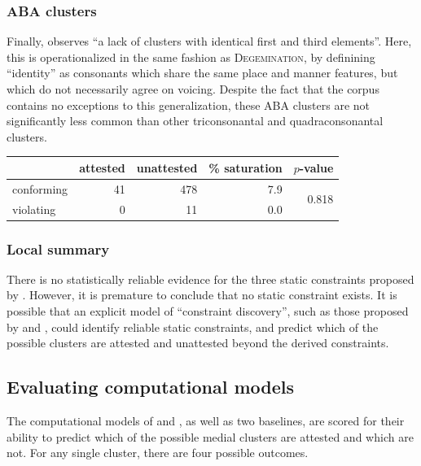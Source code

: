 \subsubsection{ABA clusters}

Finally, \citet[][176]{Pierrehumbert1994} observes ``a lack of clusters with identical first and third elements''. Here, this is operationalized in the same fashion as \textsc{Degemination}, by definining ``identity'' as consonants which share the same place and manner features, but which do not necessarily agree on voicing. Despite the fact that the corpus contains no exceptions to this generalization, these \textsc{ABA} clusters are not significantly less common than other triconsonantal and quadraconsonantal clusters.

\begin{example}
\begin{tabular}{l r r r r}
\toprule
           & attested & unattested & \% saturation & $p$-value \\
\midrule
conforming & 41       & 478        & 7.9      & \multirow{2}{*}{0.818} \\
violating  &  0       &  11        & 0.0                               \\
\bottomrule
\end{tabular}
\end{example}

\subsubsection{Local summary}

There is no statistically reliable evidence for the three static constraints proposed by \citeauthor{Pierrehumbert1994}. However, it is premature to conclude that no static constraint exists. It is possible that an explicit model of ``constraint discovery'', such as those proposed by \citet{Pierrehumbert1994} and \citet{Hayes2008a}, could identify reliable static constraints, and predict which of the possible clusters are attested and unattested beyond the derived constraints. 

\subsection{Evaluating computational models}

The computational models of \citeauthor{Pierrehumbert1994} and \citeauthor{Hayes2008a}, as well as two baselines, are scored for their ability to predict which of the possible medial clusters are attested and which are not. For any single cluster, there are four possible outcomes.

